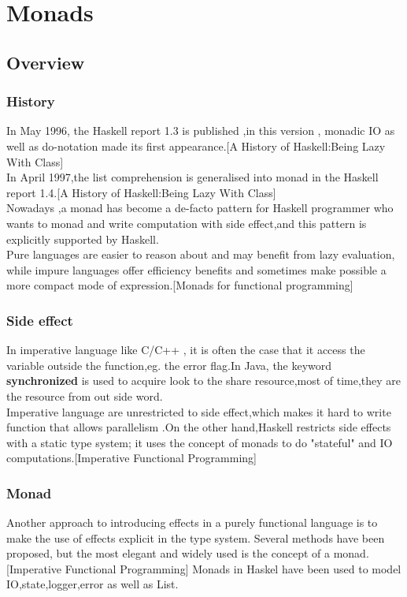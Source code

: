 \chapter{Monads}
\section{Overview}


\subsection{History}
In May 1996, the Haskell report 1.3 is published ,in this version , monadic IO as well as do-notation made its first appearance.[A History of Haskell:Being Lazy With Class] \\

In April 1997,the list comprehension is generalised into monad in the Haskell report 1.4.[A History of Haskell:Being Lazy With Class]\\ 

Nowadays ,a monad has become a de-facto pattern for Haskell programmer who wants to monad and write computation with side effect,and this pattern is explicitly supported by Haskell.\\


Pure languages are easier to reason about and may benefit from lazy
evaluation, while impure languages offer efficiency benefits and sometimes make possible a more compact mode of expression.[Monads for functional programming]



\subsection{Side effect}
In imperative language like C/C++ , it is often the case that it access the variable outside the function,eg. the error flag.In Java, the keyword \textbf{synchronized} is used to acquire look to the share resource,most of time,they are the resource from out side word.\\

Imperative language are unrestricted to side effect,which makes it hard to write function that allows parallelism .On the other hand,Haskell restricts side effects with a static type system; it uses the concept of monads to do "stateful" and IO computations.[Imperative Functional Programming]



\subsection{Monad}
Another approach to introducing effects in a purely functional language
is to make the use of effects explicit in the type system. Several methods
have been proposed, but the most elegant and widely used is the concept
of a monad.[Imperative Functional Programming]  Monads in Haskel have been used to model IO,state,logger,error as well as List.


